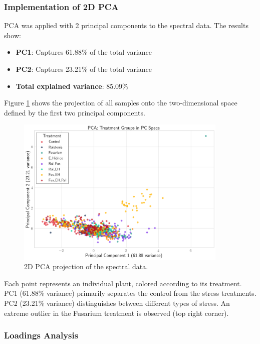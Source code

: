 \documentclass[12pt,a4paper]{article}
\begin{document}
\subsubsection{Implementation of 2D PCA}

PCA was applied with 2 principal components to the spectral data. The results show:

\begin{itemize}
    \item \textbf{PC1}: Captures 61.88\% of the total variance
    \item \textbf{PC2}: Captures 23.21\% of the total variance
    \item \textbf{Total explained variance}: 85.09\%
\end{itemize}

Figure \ref{fig:pca2d} shows the projection of all samples onto the two-dimensional space defined by the first two principal components.

\begin{figure}[H]
    \centering
    \includegraphics[width=0.9\textwidth]{Plots/2D_PCA.png}
    \caption{2D PCA projection of the spectral data. }
    \label{fig:pca2d}
\end{figure}

Each point represents an individual plant, colored according to its treatment. PC1 (61.88\% variance) primarily separates the control from the stress treatments. PC2 (23.21\% variance) distinguishes between different types of stress. An extreme outlier in the Fusarium treatment is observed (top right corner).

\subsubsection{Loadings Analysis}
\end{document}

